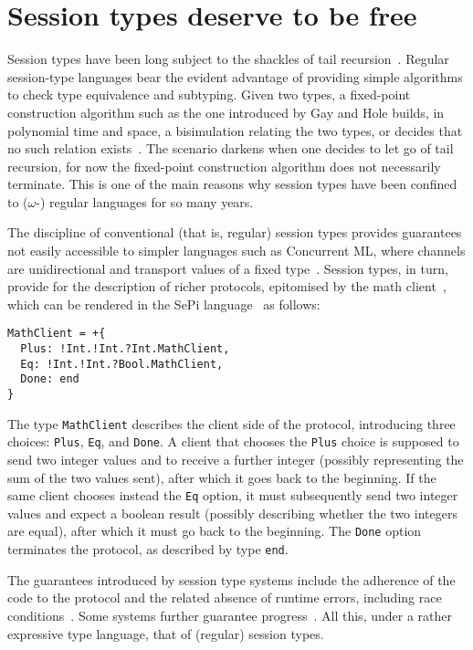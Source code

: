 \section{Session types deserve to be free}

Session types have been long subject to the shackles of tail
recursion~\cite{DBLP:conf/concur/Honda93,DBLP:conf/esop/HondaVK98}. Regular
session-type languages bear the evident advantage of providing simple
algorithms to check type equivalence and subtyping. Given two types, a
fixed-point construction algorithm such as the one introduced by Gay
and Hole builds, in polynomial time and space, a bisimulation relating
the two types, or decides that no such relation
exists~\cite{DBLP:journals/acta/GayH05}. The scenario darkens when one
decides to let go of tail recursion, for now the fixed-point
construction algorithm does not necessarily terminate.
%
This is one of the main reasons why session types have been confined
to ($\omega$-) regular languages for so many years.

The discipline of conventional (that is, regular) session types
provides guarantees not easily accessible to simpler languages such as
Concurrent ML, where channels are unidirectional and transport values
of a fixed type~\cite{DBLP:conf/mcmaster/Reppy93}. Session types, in
turn, provide for the description of richer protocols, epitomised by
the math client~\cite{DBLP:journals/acta/GayH05}, which can be
rendered in the SePi language~\cite{DBLP:conf/sefm/FrancoV13} as
follows:
%
\begin{lstlisting}[morekeywords=end]
MathClient = +{
  Plus: !Int.!Int.?Int.MathClient,
  Eq: !Int.!Int.?Bool.MathClient,
  Done: end
}
\end{lstlisting}

The type \lstinline|MathClient| describes the client side of the
protocol, introducing three choices: \lstinline|Plus|, \lstinline|Eq|,
and \lstinline|Done|. A client that chooses the \lstinline|Plus|
choice is supposed to send two integer values and to receive a further
integer (possibly representing the sum of the two values sent), after
which it goes back to the beginning. If the same client chooses
instead the \lstinline|Eq| option, it must subsequently send two
integer values and expect a boolean result (possibly describing
whether the two integers are equal), after which it must go back to
the beginning.  The \lstinline|Done| option terminates the protocol,
as described by type \lstinline[morekeywords=end]|end|.

The guarantees introduced by session type systems include the
adherence of the code to the protocol and the related absence of
runtime errors, including race
conditions~\cite{DBLP:conf/esop/HondaVK98}. Some systems further
guarantee progress~\cite{DBLP:conf/concur/CairesP10}. All this, under
a rather expressive type language, that of (regular) session types.

